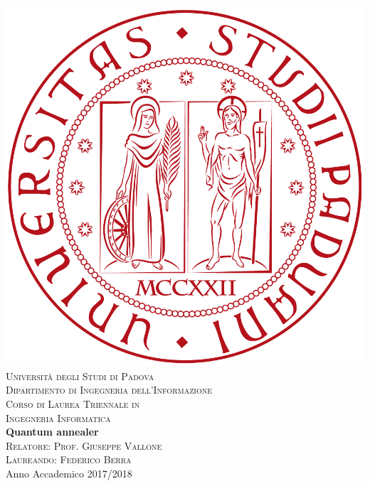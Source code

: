 \begin{titlepage}
\begin{center}
\includegraphics[scale=0.08]{Immagini/logo.png}\\[1.5cm]
\textsc{\LARGE Universit\`{a} degli Studi di Padova}\\[1.2cm]
\textsc{\Large Dipartimento di Ingegneria dell'Informazione}\\[0.8cm]
\textsc{\Large Corso di Laurea Triennale in}\\[0.5cm]
\textsc{\Large Ingegneria Informatica}\\[2cm]
{ \LARGE \bfseries Quantum annealer}\\[2cm]
\textsc{\large Relatore: Prof. Giuseppe Vallone}\\[0.5cm]
\textsc{\large Laureando: Federico Berra}\\
\vfill
{\large Anno Accademico 2017/2018}
\end{center}
\end{titlepage}
